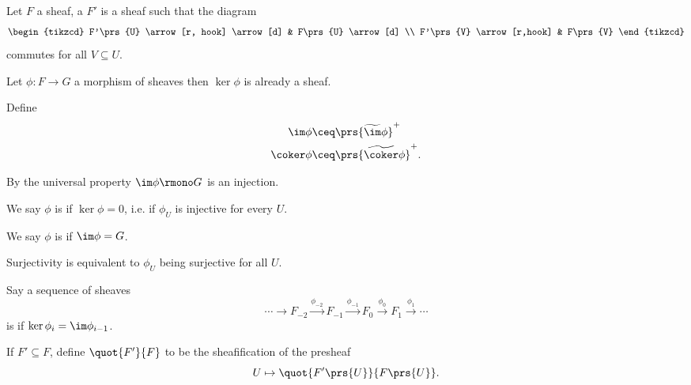 \documentclass[10pt,a4paper,twoside,openany,hidelinks]{book}
\begin{document}
\begin{definition}[Subsheaf]
Let $F$ a sheaf, a  $F'$ is a sheaf such that the diagram
\[
\begin{tikzcd}
F'\prs{U} \arrow[r, hook] \arrow[d] & F\prs{U} \arrow[d] \\
F'\prs{V} \arrow[r,hook] & F\prs{V}
\end{tikzcd}
\]
commutes for all $V \subseteq U$.
\end{definition}

\begin{definition}[$\coker, \im$]
Let $\phi \colon F \to G$ a morphism of sheaves then $\ker \phi$ is already a sheaf.

Define
\begin{align*}
\im \phi &\ceq \prs{\widetilde{\im} \phi}^+ \\
\coker\phi &\ceq \prs{\widetilde{\coker} \phi}^+ \text{.}
\end{align*}
\end{definition}

\begin{remark}
By the universal property $\im \phi \rmono G$ is an injection.
\end{remark}

\begin{definition}
We say $\phi$ is  if $\ker \phi = 0$, i.e. if $\phi_U$ is injective for every $U$.
\end{definition}

\begin{definition}
We say $\phi$ is  if $\im \phi = G$.
\end{definition}

\begin{remark}
Surjectivity is  equivalent to $\phi_U$ being surjective for all $U$.
\end{remark}

\begin{definition}
Say a sequence of sheaves
\[\cdots \rightarrow F_{-2} \xrightarrow{\phi_{-2}} F_{-1} \xrightarrow{\phi_{-1}} F_0 \xrightarrow{\phi_0} F_1 \xrightarrow{\phi_1} \cdots\]
is  if $\ker \phi_i = \im \phi_{i-1}$.

If $F' \subseteq F$, define $\quot{F'}{F}$ to be the sheafification of the presheaf
\[U \mapsto \quot{F'\prs{U}}{F\prs{U}} \text{.}\]
\end{definition}
\end{document}
